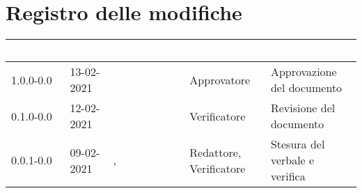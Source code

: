 \section*{Registro delle modifiche}
{
\setcounter{table}{-1}
{
\renewcommand{\arraystretch}{1.5}
\centering
\begin{longtable}{C{1.7cm} | C{2.5cm} | C{3.2cm} | C{2.7cm} | C{4.8cm}}
\textcolor{white}{\textbf{Versione}}&
\textcolor{white}{\textbf{Data}}&
\textcolor{white}{\textbf{Nominativo}}&
\textcolor{white}{\textbf{Ruolo}}&
\textcolor{white}{\textbf{Descrizione}}\\	
\endhead

1.0.0-0.0 & 13-02-2021 & \Approvatore{} & Approvatore & Approvazione del documento\\	
0.1.0-0.0 & 12-02-2021 & \Verificatori{} & Verificatore & Revisione del documento\\		
0.0.1-0.0 & 09-02-2021 & \Redattori{}, \Verificatori{} & Redattore, Verificatore & Stesura del verbale e verifica\\
		
\end{longtable}
}
}
